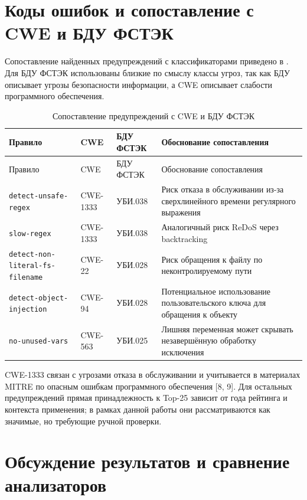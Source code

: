 \section{Коды ошибок и сопоставление с CWE и БДУ ФСТЭК} \label{ch3:sec5}

Сопоставление найденных предупреждений с классификаторами приведено в
. Для БДУ ФСТЭК использованы близкие по смыслу классы угроз,
так как БДУ описывает угрозы безопасности информации, а CWE описывает слабости
программного обеспечения.

\noindent
\begingroup
\centering
\small
\begin{longtable}[c]{|p{3.2cm}|p{3.6cm}|p{3.2cm}|p{4.2cm}|}
    \caption{Сопоставление предупреждений с CWE и БДУ ФСТЭК}
    \label{tab:cwe-bdu}
    \\
    \hline
    Правило & CWE & БДУ ФСТЭК & Обоснование сопоставления \\ \hline
    \endfirsthead
    \hline
    Правило & CWE & БДУ ФСТЭК & Обоснование сопоставления \\ \hline
    \endhead
    \hline
    \texttt{detect-unsafe-regex} & CWE-1333 & УБИ.038 & Риск отказа в обслуживании из-за сверхлинейного времени регулярного выражения \\ \hline
    \texttt{slow-regex} & CWE-1333 & УБИ.038 & Аналогичный риск ReDoS через backtracking \\ \hline
    \texttt{detect-non-literal-fs-filename} & CWE-22 & УБИ.028 & Риск обращения к файлу по неконтролируемому пути \\ \hline
    \texttt{detect-object-injection} & CWE-94 & УБИ.028 & Потенциальное использование пользовательского ключа для обращения к объекту \\ \hline
    \texttt{no-unused-vars} & CWE-563 & УБИ.025 & Лишняя переменная может скрывать незавершённую обработку исключения \\ \hline
\end{longtable}
\normalsize
\endgroup

CWE-1333 связан с угрозами отказа в обслуживании и учитывается в материалах MITRE
по опасным ошибкам программного обеспечения [8, 9]. Для остальных предупреждений
прямая принадлежность к Top-25 зависит от года рейтинга и контекста применения;
в рамках данной работы они рассматриваются как значимые, но требующие ручной
проверки.

\section{Обсуждение результатов и сравнение анализаторов} \label{ch3:sec6}


